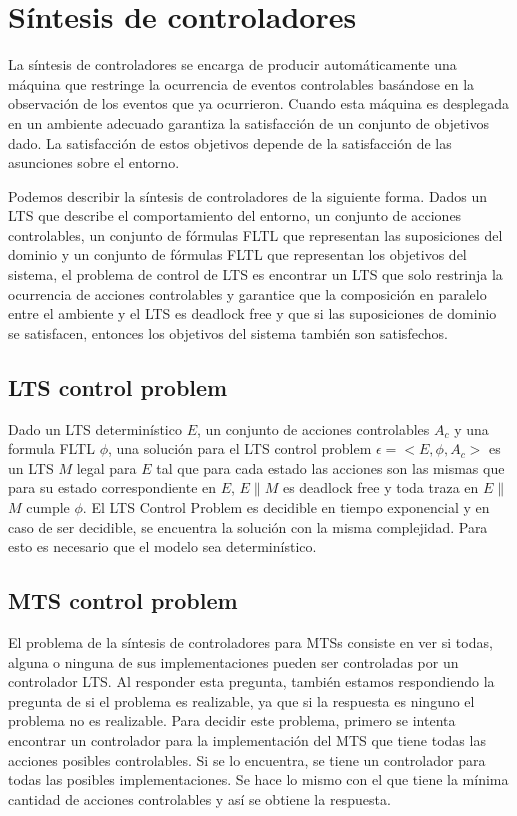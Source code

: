 \section{Síntesis de controladores}

La síntesis de controladores se encarga de producir automáticamente una máquina que restringe la ocurrencia de eventos
controlables basándose en la observación de los eventos que ya ocurrieron. Cuando esta máquina es desplegada en un ambiente
adecuado garantiza la satisfacción de un conjunto de objetivos dado. La satisfacción de estos objetivos depende de la
satisfacción de las asunciones sobre el entorno.

\vspace{\baselineskip}
Podemos describir la síntesis de controladores de la siguiente forma. Dados un LTS que describe el comportamiento
del entorno, un conjunto de acciones controlables, un conjunto de fórmulas FLTL que representan las suposiciones
del dominio y un conjunto de fórmulas FLTL que representan los objetivos del sistema, el problema de control de
LTS es encontrar un LTS que solo restrinja la ocurrencia de acciones controlables y garantice que la composición
en paralelo entre el ambiente y el LTS es deadlock free y que si las suposiciones de dominio se satisfacen, entonces
los objetivos del sistema también son satisfechos.

\subsection{LTS control problem}

Dado un LTS determinístico $E$, un conjunto de acciones controlables $A_{c}$ y una formula FLTL $\phi$, una solución 
para el LTS control problem $\epsilon = <E, \phi, A_{c}>$ es un LTS $M$ legal para $E$ tal que para cada estado las
acciones son las mismas que para su estado correspondiente en $E$, $E\parallel$$M$ es deadlock free y toda traza en
$E\parallel$$M$ cumple $\phi$. El LTS Control Problem es decidible en tiempo exponencial y en caso de ser decidible,
se encuentra la solución con la misma complejidad. Para esto es necesario que el modelo sea determinístico.

\subsection{MTS	control problem}

El problema de la síntesis de controladores para MTSs consiste en ver si todas, alguna o ninguna de sus implementaciones
pueden ser controladas por un controlador LTS. Al responder esta pregunta, también estamos respondiendo la pregunta de
si el problema es realizable, ya que si la respuesta es ninguno el problema no es realizable. Para decidir este problema,
primero se intenta encontrar un controlador para la implementación del MTS que tiene todas las acciones posibles controlables.
Si se lo encuentra, se tiene un controlador para todas las posibles implementaciones. Se hace lo mismo con el que tiene la
mínima cantidad de acciones controlables y así se obtiene la respuesta.